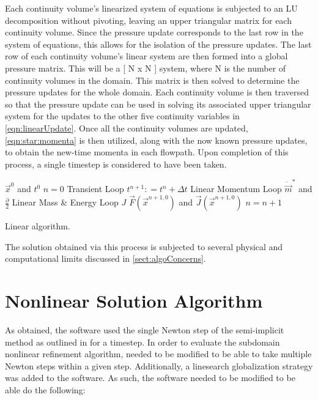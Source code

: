 Each continuity volume's linearized system of equations is subjected to an LU decomposition without pivoting, leaving an upper triangular matrix for each continuity volume.
Since the pressure update corresponds to the last row in the system of equations, this allows for the isolation of the pressure updates.
The last row of each continuity volume's linear system are then formed into a global pressure matrix.
This will be a [ N x N ] system, where N is the number of continuity volumes in the domain.
This matrix is then solved to determine the pressure updates for the whole domain.
Each continuity volume is then traversed so that the pressure update can be used in solving its associated upper triangular system for the updates to the other five continuity variables in \eqref{eqn:linearUpdate}.
Once all the continuity volumes are updated, \eqref{eqn:star:momenta} is then utilized, along with the now known pressure updates, to obtain the new-time momenta in each flowpath.
Upon completion of this process, a single timestep is considered to have been taken.

\begin{algo}[H]
\setlength{\baselineskip}{0.625\baselineskip}
\begin{algorithmic}[1]
\Require $\vec{x}^{0}$ and $t^{0}$
\Set $n = 0$
\Loop \; Transient Loop
    \State $t^{n+1} : = t^{n} + \Delta t$
   	\Loop \; Linear Momentum Loop
   		\Calculate $\dot{\vec{m}}^{*}$ and $\frac{\partial}{2}$   		
   	\EndLoop
   	\Loop \; Linear Mass \& Energy Loop
   		\Calculate $J$
   	\EndLoop
	\Calculate $\vec{F}(\vec{x}^{n+1,0})$ and $\vec{J}(\vec{x}^{n+1,0})$
	\State $n = n + 1$
\EndLoop
\end{algorithmic}
\caption{Linear \cobra{} algorithm.}
\label{alg:linCobraAlgorithm}
\end{algo}


The solution obtained via this process is subjected to several physical and computational limits discussed in \eqref{sect:algoConcerns}.

\section{Nonlinear Solution Algorithm}
\label{sect:nlnCobraAlg}
As obtained, the \cobra{} software used the single Newton step of the semi-implicit method as outlined in  for a timestep.
In order to evaluate the subdomain nonlinear refinement algorithm, \cobra{} needed to be modified to be able to take multiple Newton steps within a given step.
Additionally, a linesearch globalization strategy was added to the software.
As such, the \cobra{} software needed to be modified to be able do the following:

